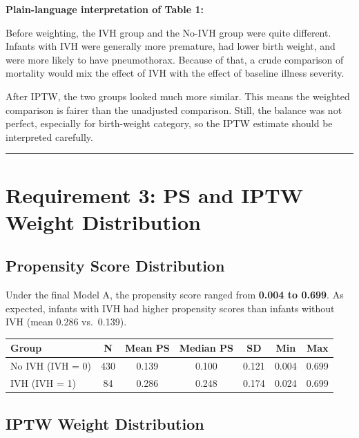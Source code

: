 \documentclass[
]{article}
\begin{document}
\textbf{Plain-language interpretation of Table 1:}

Before weighting, the IVH group and the No-IVH group were quite
different. Infants with IVH were generally more premature, had lower
birth weight, and were more likely to have pneumothorax. Because of
that, a crude comparison of mortality would mix the effect of IVH with
the effect of baseline illness severity.

After IPTW, the two groups looked much more similar. This means the
weighted comparison is fairer than the unadjusted comparison. Still, the
balance was not perfect, especially for birth-weight category, so the
IPTW estimate should be interpreted carefully.

\begin{center}\rule{0.5\linewidth}{0.5pt}\end{center}

\hypertarget{requirement-3-ps-and-iptw-weight-distribution}{%
\section{Requirement 3: PS and IPTW Weight
Distribution}\label{requirement-3-ps-and-iptw-weight-distribution}}

\hypertarget{propensity-score-distribution}{%
\subsection{Propensity Score
Distribution}\label{propensity-score-distribution}}

Under the final Model A, the propensity score ranged from \textbf{0.004
to 0.699}. As expected, infants with IVH had higher propensity scores
than infants without IVH (mean 0.286 vs.~0.139).

\begin{longtable}[]{@{}lcccccc@{}}
\toprule
Group & N & Mean PS & Median PS & SD & Min & Max \\
\midrule
\endhead
No IVH (IVH = 0) & 430 & 0.139 & 0.100 & 0.121 & 0.004 & 0.699 \\
IVH (IVH = 1) & 84 & 0.286 & 0.248 & 0.174 & 0.024 & 0.699 \\
\bottomrule
\end{longtable}

\hypertarget{iptw-weight-distribution}{%
\subsection{IPTW Weight Distribution}\label{iptw-weight-distribution}}
\end{document}

